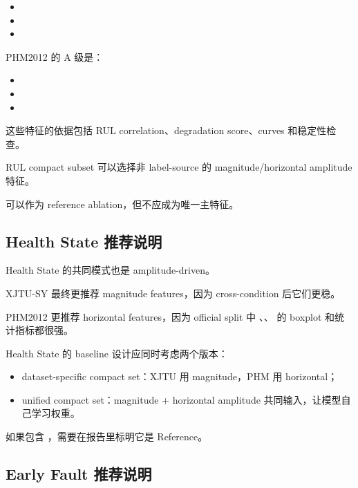 \begin{itemize}[leftmargin=2em]
  \item {}
  \item {}
  \item {}
\end{itemize}

PHM2012 的 A 级是：

\begin{itemize}[leftmargin=2em]
  \item {}
  \item {}
  \item {}
\end{itemize}

这些特征的依据包括 RUL correlation、degradation score、curves 和稳定性检查。

RUL compact subset 可以选择非 label-source 的 magnitude/horizontal amplitude 特征。

 可以作为 reference ablation，但不应成为唯一主特征。

\subsection{Health State 推荐说明}

Health State 的共同模式也是 amplitude-driven。

XJTU-SY 最终更推荐 magnitude features，因为 cross-condition 后它们更稳。

PHM2012 更推荐 horizontal features，因为 official split 中 、、 的 boxplot 和统计指标都很强。

Health State 的 baseline 设计应同时考虑两个版本：

\begin{itemize}[leftmargin=2em]
  \item dataset-specific compact set：XJTU 用 magnitude，PHM 用 horizontal；
  \item unified compact set：magnitude + horizontal amplitude 共同输入，让模型自己学习权重。
\end{itemize}

如果包含 ，需要在报告里标明它是 Reference。

\subsection{Early Fault 推荐说明}

